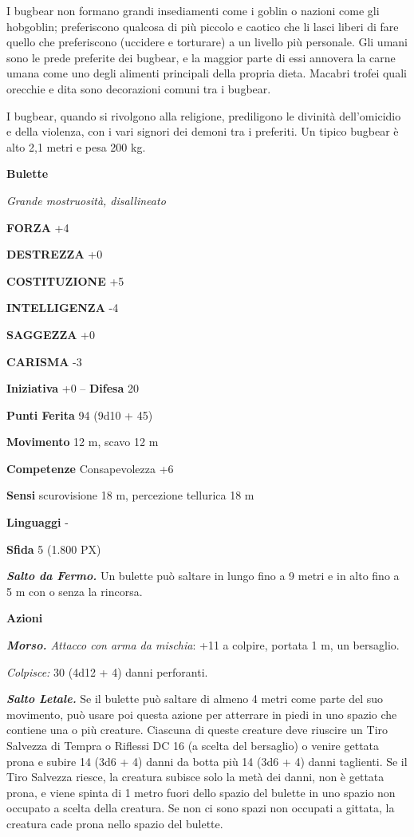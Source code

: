 \begin{multicols}{2}
	I bugbear non formano grandi insediamenti come i goblin o nazioni come gli hobgoblin; preferiscono qualcosa di più piccolo e caotico che li lasci liberi di fare quello che preferiscono (uccidere e torturare) a un livello più personale. Gli umani sono le prede preferite dei bugbear, e la maggior parte di essi annovera la carne umana come uno degli alimenti principali della propria dieta. Macabri trofei quali orecchie e dita sono decorazioni comuni tra i bugbear.

	I bugbear, quando si rivolgono alla religione, prediligono le divinità dell'omicidio e della violenza, con i vari signori dei demoni tra i preferiti. Un tipico bugbear è alto 2,1 metri e pesa 200 kg.

	\medskip{}\textbf{Bulette}

	\textit{Grande mostruosità, disallineato}

	\textbf{FORZA} +4

	\textbf{DESTREZZA} +0

	\textbf{COSTITUZIONE} +5

	\textbf{INTELLIGENZA} -4

	\textbf{SAGGEZZA} +0

	\textbf{CARISMA} -3

	\textbf{Iniziativa} +0 -- \textbf{Difesa} 20

	\textbf{Punti Ferita} 94 (9d10 + 45)

	\textbf{Movimento} 12 m, scavo 12 m

	\textbf{Competenze} Consapevolezza +6

	\textbf{Sensi} scurovisione 18 m, percezione tellurica 18 m

	\textbf{Linguaggi} -

	\textbf{Sfida} 5 (1.800 PX)

	\textit{\textbf{Salto da Fermo.}} Un bulette può saltare in lungo fino a 9 metri e in alto fino a 5 m con o senza la rincorsa.

	\textbf{Azioni}

	\textit{\textbf{Morso.} Attacco con arma da mischia}: +11 a colpire, portata 1 m, un bersaglio.

	\textit{Colpisce:} 30 (4d12 + 4) danni perforanti.

	\textit{\textbf{Salto Letale.}} Se il bulette può saltare di almeno 4 metri come parte del suo movimento, può usare poi questa azione per atterrare in piedi in uno spazio che contiene una o più creature. Ciascuna di queste creature deve riuscire un Tiro Salvezza di Tempra o Riflessi DC 16 (a scelta del bersaglio) o venire gettata prona e subire 14 (3d6 + 4) danni da botta più 14 (3d6 + 4) danni taglienti. Se il Tiro Salvezza riesce, la creatura subisce solo la metà dei danni, non è gettata prona, e viene spinta di 1 metro fuori dello spazio del bulette in uno spazio non occupato a scelta della creatura. Se non ci sono spazi non occupati a gittata, la creatura cade prona nello spazio del bulette.


\end{multicols}
